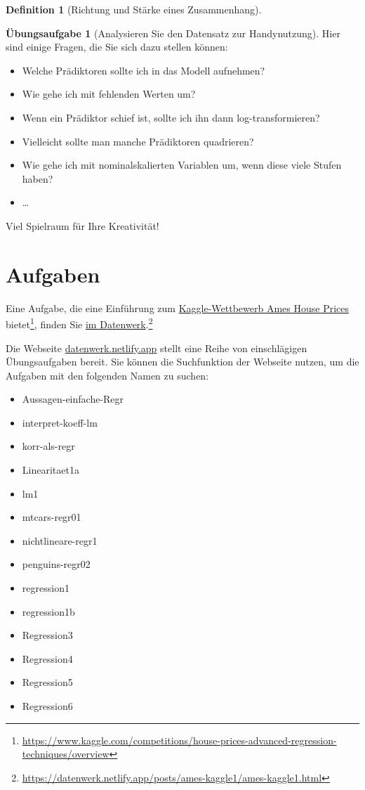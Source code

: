 \documentclass[
  a4paper,
  DIV=11]{scrreprt}
\providecommand{\tightlist}{%
  \setlength{\itemsep}{0pt}\setlength{\parskip}{0pt}}\usepackage{longtable,booktabs,array}
\theoremstyle{definition}
\newtheorem{exercise}{Übungsaufgabe}[chapter]
\theoremstyle{definition}
\theoremstyle{definition}
\newtheorem{definition}{Definition}[chapter]
\theoremstyle{remark}
\begin{document}
\begin{definition}[Richtung und Stärke eines
Zusammenhang]
\begin{exercise}[Analysieren Sie den Datensatz zur
Handynutzung]
Hier sind einige Fragen, die Sie sich dazu stellen können:

\begin{itemize}
\tightlist
\item
  Welche Prädiktoren sollte ich in das Modell aufnehmen?
\item
  Wie gehe ich mit fehlenden Werten um?
\item
  Wenn ein Prädiktor schief ist, sollte ich ihn dann log-transformieren?
\item
  Vielleicht sollte man manche Prädiktoren quadrieren?
\item
  Wie gehe ich mit nominalskalierten Variablen um, wenn diese viele
  Stufen haben?
\item
  \ldots{}
\end{itemize}

Viel Spielraum für Ihre Kreativität!

\section{Aufgaben}\label{aufgaben-7}

Eine Aufgabe, die eine Einführung zum
\href{https://www.kaggle.com/competitions/house-prices-advanced-regression-techniques/overview}{Kaggle-Wettbewerb
Ames House Prices} bietet\footnote{\url{https://www.kaggle.com/competitions/house-prices-advanced-regression-techniques/overview}},
finden Sie
\href{https://datenwerk.netlify.app/posts/ames-kaggle1/ames-kaggle1.html}{im
Datenwerk}.\footnote{\url{https://datenwerk.netlify.app/posts/ames-kaggle1/ames-kaggle1.html}}

Die Webseite \href{https://datenwerk.netlify.app}{datenwerk.netlify.app}
stellt eine Reihe von einschlägigen Übungsaufgaben bereit. Sie können
die Suchfunktion der Webseite nutzen, um die Aufgaben mit den folgenden
Namen zu suchen:

\begin{itemize}
\tightlist
\item
  Aussagen-einfache-Regr
\item
  interpret-koeff-lm
\item
  korr-als-regr
\item
  Linearitaet1a
\item
  lm1
\item
  mtcars-regr01
\item
  nichtlineare-regr1
\item
  penguins-regr02
\item
  regression1
\item
  regression1b
\item
  Regression3
\item
  Regression4
\item
  Regression5
\item
  Regression6
\end{itemize}


\end{exercise}
\end{definition}
\end{document}
